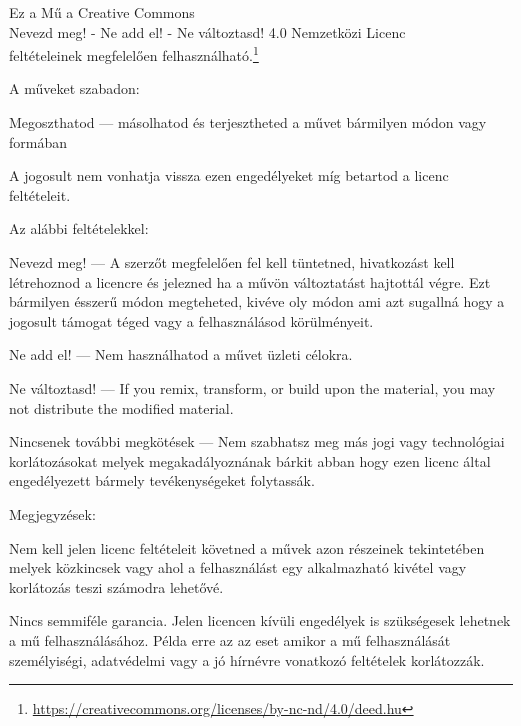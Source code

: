 \cleartorecto
\widepagelayout
\thispagestyle{plain}

{\fontsize{9}{11}\selectfont%
\setlength{\parindent}{0pt}%
\raggedright\label{copyright-details}%
\setlength{\parskip}{7pt}%

{\centering

{\LARGE\ccbyncnd}

Ez a Mű a Creative Commons\\
Nevezd meg! - Ne add el! - Ne változtasd! 4.0 Nemzetközi Licenc\\
feltételeinek megfelelően felhasználható.\footnote{%
\href{https://creativecommons.org/licenses/by-nc-nd/4.0/deed.hu}{https://creativecommons.org/licenses/by-nc-nd/4.0/deed.hu}}

}

A műveket szabadon:

\begin{packeditemize}
\item Megoszthatod — másolhatod és terjesztheted a művet bármilyen módon vagy formában
\end{packeditemize}

A jogosult nem vonhatja vissza ezen engedélyeket míg betartod a licenc feltételeit.

Az alábbi feltételekkel:

\begin{packeditemize}
\item Nevezd meg! — A szerzőt megfelelően fel kell tüntetned, hivatkozást kell létrehoznod a licencre és jelezned ha a művön változtatást hajtottál végre. Ezt bármilyen ésszerű módon megteheted, kivéve oly módon ami azt sugallná hogy a jogosult támogat téged vagy a felhasználásod körülményeit.
\item Ne add el! — Nem használhatod a művet üzleti célokra.
\item Ne változtasd! — If you remix, transform, or build upon the material, you may not distribute the modified material.
\end{packeditemize}

Nincsenek további megkötések — Nem szabhatsz meg más jogi vagy technológiai korlátozásokat melyek megakadályoznának bárkit abban hogy ezen licenc által engedélyezett bármely tevékenységeket folytassák.

Megjegyzések:

Nem kell jelen licenc feltételeit követned a művek azon részeinek tekintetében melyek közkincsek vagy ahol a felhasználást egy alkalmazható kivétel vagy korlátozás teszi számodra lehetővé.

Nincs semmiféle garancia. Jelen licencen kívüli engedélyek is szükségesek lehetnek a mű felhasználásához. Példa erre az az eset amikor a mű felhasználását személyiségi, adatvédelmi vagy a jó hírnévre vonatkozó feltételek korlátozzák.

}

\clearpage
\normalpagelayout
